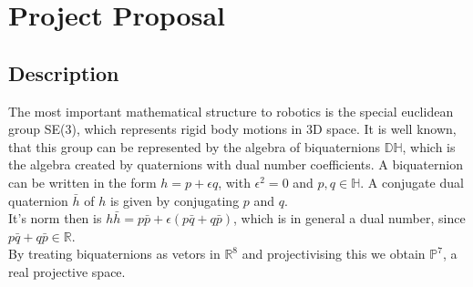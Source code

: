 \chapter{Project Proposal}

\section{Description}
The most important mathematical structure to robotics is the special euclidean group SE(3), which represents rigid body motions in 3D space\cite{selig}. 
It is well known, that this group can be represented by the algebra of biquaternions $\mathbb{DH}$, which is the algebra created by quaternions with dual number coefficients\cite{selig}. A biquaternion can be written in the form $h = p + \epsilon q$, with $\epsilon^2 = 0$ and $p,q \in \mathbb{H}$. A conjugate dual quaternion $\bar{h}$ of $h$ is given by conjugating $p$ and $q$.\\
It's norm then is $h\bar{h} = p\bar{p} + \epsilon(p\bar{q} + q\bar{p})$, which is in general a dual number, since $p\bar{q} + q\bar{p} \in \mathbb{R}$.\\
By treating biquaternions as vetors in $\mathbb{R}^{8}$ and projectivising this we obtain $\mathbb{P}^{7}$, a real projective space\cite{Heged_s_2013}.

